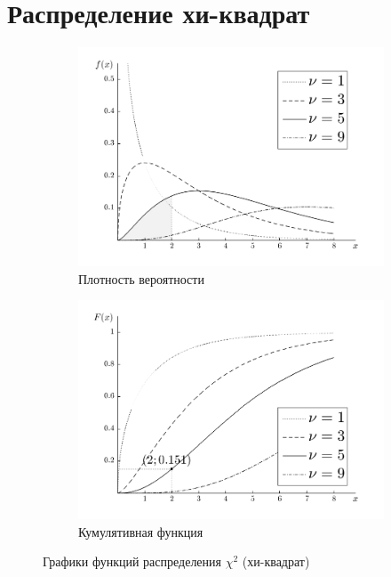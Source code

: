 \documentclass[12pt,a4paper]{article}
\begin{document}
\section{Распределение хи-квадрат}
\begin{figure}[H]
\centering
	\begin{subfigure}[t]{7cm}
		\centering
		\includegraphics[scale=0.5]{img/xdistribution_pdf.png}
		\caption{Плотность вероятности}
\label{fig:a_normal_pdf}	
	\end{subfigure}
	\begin{subfigure}[t]{5cm}
		\centering
		\includegraphics[scale=0.5]{img/xdistribution_cdf.png}
		\caption{Кумулятивная функция}
\label{fig:b_normal_cdf}
	\end{subfigure}
	\caption{Графики функций распределения $\chi^2$ (хи-квадрат)}\label{fig:df_and_cdf}
\end{figure}
\end{document}
